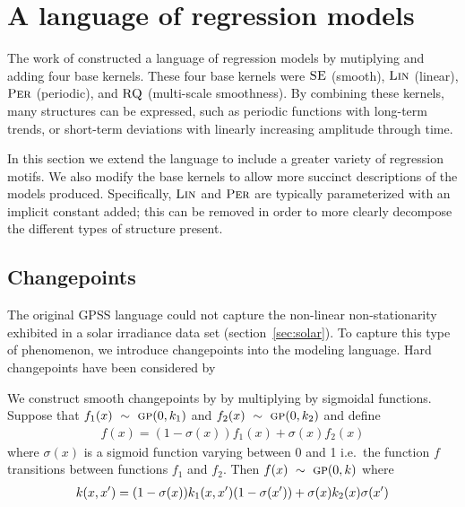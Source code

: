 \documentclass{article}
\def\ie{i.e.\ }
\begin{document}
\section{A language of regression models}
\label{sec:improvements}

The work of \cite{DuvLloGroetal13} constructed a language of regression models by mutiplying and adding four base kernels.
These four base kernels were ${\textsc{SE}}$ (smooth), ${\textsc{Lin}}$ (linear), ${\textsc{Per}}$ (periodic), and ${\textsc{RQ}}$ (multi-scale smoothness).
By combining these kernels, many structures can be expressed, such as periodic functions with long-term trends, or short-term deviations with linearly increasing amplitude through time.

In this section we extend the language to include a greater variety of regression motifs.
We also modify the base kernels to allow more succinct descriptions of the models produced.
Specifically, ${\textsc{Lin}}$ and ${\textsc{Per}}$ are typically parameterized with an implicit constant added; this can be removed in order to more clearly decompose the different types of structure present.


\subsection{Changepoints}

The original GPSS language could not capture the non-linear non-stationarity exhibited in a solar irradiance data set (section~\ref{sec:solar}).
To capture this type of phenomenon, we introduce changepoints into the modeling language.
Hard changepoints have been considered by \citep[e.g.][]{garnett2010sequential, FoxDunson:NIPS2012}

We construct smooth changepoints by by multiplying by sigmoidal functions.
Suppose that $f_1(x) \ \sim\  {\textsc{gp}}{}(0, k_1)$ and $f_2(x) \ \sim\  {\textsc{gp}}{}(0, k_2)$ and define
\begin{align}
f(x) = (1-\sigma(x))f_1(x) + \sigma(x)f_2(x)
\end{align}
where $\sigma(x)$ is a sigmoid function varying between 0 and 1 \ie the function $f$ transitions between functions $f_1$ and $f_2$.
Then $f(x) \ \sim\  {\textsc{gp}}{}(0,k)$ where
\begin{align}
\kernel(x,x') = (1-\sigma(x))k_1(x,x')(1-\sigma(x')) + \sigma(x)k_2(x)\sigma(x')
\label{eq:cp}
\end{align}
\end{document}
